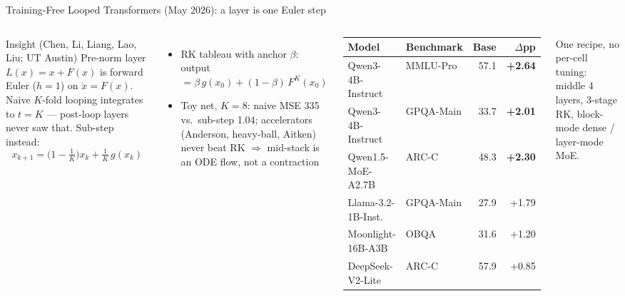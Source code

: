 \documentclass[aspectratio=169,10pt]{beamer}
\newcommand{\con}[1]{\textcolor{negative}{#1}}
\newcommand{\HL}[1]{\textcolor{emphasis}{#1}}
\begin{document}
\begin{frame}{Training-Free Looped Transformers (May 2026): a layer is one Euler step}
  \begin{columns}[T]
      \begin{block}{Insight (Chen, Li, Liang, Lao, Liu; UT Austin)}
        Pre-norm layer $L(x) = x + F(x)$ is forward Euler ($h{=}1$) on $\dot x = F(x)$.
        Naive $K$-fold looping integrates to $t{=}K$ --- \con{post-loop layers never saw that}.
        Sub-step instead:
        \[ x_{k+1} = \Big(1-\tfrac{1}{K}\Big)x_k + \tfrac{1}{K}\,g(x_k) \]
      \end{block}
      \begin{itemize}
        \item RK tableau with anchor $\beta$: output $= \beta\, g(x_0) + (1-\beta)\,F^K(x_0)$
        \item Toy net, $K{=}8$: naive MSE 335 vs.\ sub-step 1.04; accelerators (Anderson, heavy-ball, Aitken) never beat RK $\Rightarrow$ mid-stack is \HL{an ODE flow, not a contraction}
      \end{itemize}
      \vspace{4pt}
      \begin{center}
      \small
      \begin{tabular}{@{}llrr@{}}
        \toprule
        Model & Benchmark & Base & $\Delta$pp \\
        \midrule
        Qwen3-4B-Instruct & MMLU-Pro & 57.1 & \textbf{+2.64} \\
        Qwen3-4B-Instruct & GPQA-Main & 33.7 & \textbf{+2.01} \\
        Qwen1.5-MoE-A2.7B & ARC-C & 48.3 & \textbf{+2.30} \\
        Llama-3.2-1B-Inst. & GPQA-Main & 27.9 & +1.79 \\
        Moonlight-16B-A3B & OBQA & 31.6 & +1.20 \\
        DeepSeek-V2-Lite & ARC-C & 57.9 & +0.85 \\
        \bottomrule
      \end{tabular}
      \end{center}
      {\small One recipe, no per-cell tuning: middle 4 layers, 3-stage RK, block-mode dense / layer-mode MoE.}
  \end{columns}
\end{frame}
\end{document}
